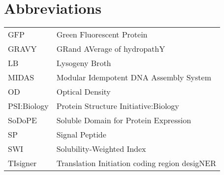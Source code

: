 \section*{Abbreviations}

\begin{table}[!hbtp]
	\begin{tabular}{ll}
		GFP         & Green Fluorescent Protein                     \\
		GRAVY       & GRand AVerage of hydropathY                   \\
		LB          & Lysogeny Broth                                \\
		MIDAS       & Modular Idempotent DNA Assembly System        \\
		OD          & Optical Density                               \\
		PSI:Biology & Protein Structure Initiative:Biology          \\
		SoDoPE      & Soluble Domain for Protein Expression         \\
		SP          & Signal Peptide \\
		SWI         & Solubility-Weighted Index                     \\
		TIsigner    & Translation Initiation coding region desigNER
	\end{tabular}
\end{table}